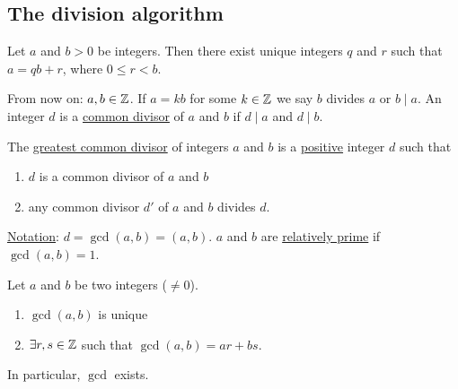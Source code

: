 \documentclass[]{article}
\begin{document}
\subsection{The division algorithm}
\begin{theorem}
	 Let $a$ and $b>0$ be integers. Then there exist unique integers $q$ and $r$ such that $a = qb +r$, where $0\leq r < b$.
\end{theorem}
From now on: $a,b\in\mathbb{Z}$. If $a =kb$ for some $k\in\mathbb{Z}$ we say $b$ divides $a$ or $b\mid a$. An integer $d$ is a \ul{common divisor} of $a$ and $b$ if $d\mid a$ and $d\mid b$.
\begin{definition}
	The \ul{greatest common divisor} of integers $a$ and $b$ is a \ul{positive} integer $d$ such that
	\begin{enumerate}
		\item $d$ is a common divisor of $a$ and $b$
		\item any common divisor $d'$ of $a$ and $b$ divides $d$.
	\end{enumerate}
	\ul{Notation}: $d = \gcd(a,b) = (a,b)$.
	$a$ and $b$ are \ul{relatively prime} if $\gcd(a,b) = 1$.
\end{definition}
\begin{theorem}
	Let $a$ and $b$ be two integers ($\neq 0$).
	\begin{enumerate}
		\item $\gcd(a,b)$ is unique
		\item $\exists r,s\in\mathbb{Z}$ such that $\gcd(a,b) = ar+bs$.
	\end{enumerate}
	In particular, $\gcd$ exists.
\end{theorem}
\end{document}
